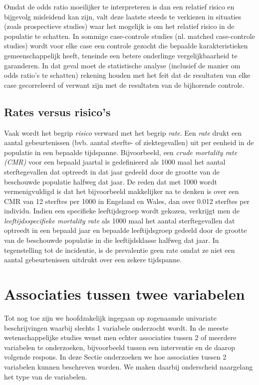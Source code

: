 \documentclass[
  12pt,dutch,coursenotes]{book}
\begin{document}
Omdat de odds ratio moeilijker te interpreteren is dan een relatief risico
en bijgevolg misleidend kan zijn, valt deze laatste steeds te verkiezen in
situaties (zoals prospectieve studies) waar het mogelijk is om het relatief
risico in de populatie te schatten. In sommige case-controle studies (nl.
matched case-controle studies) wordt voor elke case een controle gezocht die
bepaalde karakteristieken gemeenschappelijk heeft, teneinde een betere
onderlinge vergelijkbaarheid te garanderen. In dat geval moet de
statistische analyse (inclusief de manier om odds ratio's te schatten)
rekening houden met het feit dat de resultaten van elke case gecorreleerd of
verwant zijn met de resultaten van de bijhorende controle.

\hypertarget{rates-versus-risicos}{%
\subsection{Rates versus risico's}\label{rates-versus-risicos}}

Vaak wordt het begrip \emph{risico} verward met het begrip \emph{rate}. Een
\emph{rate} drukt een aantal gebeurtenissen (bvb. aantal sterfte- of
ziektegevallen) uit per eenheid in de populatie in een bepaalde tijdspanne.
Bijvoorbeeld, een \emph{crude mortality rate (CMR)} voor een bepaald
jaartal is gedefinieerd als 1000 maal het aantal sterftegevallen dat
optreedt in dat jaar gedeeld door de grootte van de beschouwde populatie
halfweg dat jaar. De reden dat met 1000 wordt vermenigvuldigd is dat het
bijvoorbeeld makkelijker na te denken is over een CMR van 12 sterftes per
1000 in Engeland en Wales, dan over 0.012 sterftes per individu. Indien een
specifieke leeftijdsgroep wordt gekozen, verkrijgt men de \emph{leeftijdsspecifieke mortality rate} als 1000 maal het aantal sterftegevallen
dat optreedt in een bepaald jaar en bepaalde leeftijdsgroep gedeeld door de
grootte van de beschouwde populatie in die leeftijdsklasse halfweg dat jaar.
In tegenstelling tot de incidentie, is de prevalentie geen rate omdat ze
niet een aantal gebeurtenissen uitdrukt over een zekere tijdspanne.

\hypertarget{associaties-tussen-twee-variabelen}{%
\section{Associaties tussen twee variabelen}\label{associaties-tussen-twee-variabelen}}

Tot nog toe zijn we hoofdzakelijk ingegaan op zogenaamde univariate beschrijvingen waarbij slechts 1 variabele onderzocht wordt. In de meeste wetenschappelijke studies wenst men echter associaties tussen 2 of meerdere variabelen te onderzoeken, bijvoorbeeld tussen een interventie en de daarop volgende respons. In deze Sectie onderzoeken we hoe associaties tussen 2 variabelen kunnen beschreven worden. We maken daarbij onderscheid naargelang het type van de variabelen.
\end{document}
